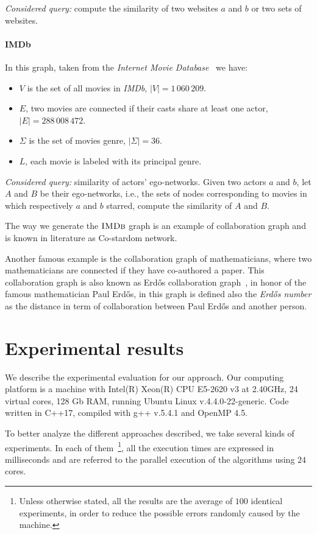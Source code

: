 \textsl{Considered query:} compute the similarity of two websites $a$ and $b$ or two sets of websites.

\paragraph*{IMDb} In this graph, taken from the \textit{Internet Movie Database}~\cite{imdb} we have:

\begin{itemize}
	\item $V$ is the set of all movies in \textit{IMDb},  $|V| = 1\,060\,209$.
	\item $E$, two movies are connected if their casts share at least one actor, $|E| = 288\,008\,472$.
	\item $\Sigma$ is the set of movies genre, $|\Sigma| = 36$.
	\item $L$, each movie is labeled with its principal genre.
\end{itemize}

\textsl{Considered query:} similarity of actors' ego-networks. Given two actors $a$ and $b$, let $A$ and $B$ be their ego-networks, i.e., the sets of nodes corresponding to movies in which respectively $a$ and $b$ starred, compute the similarity of $A$ and $B$.\medskip

The way we generate the $\textsc{IMDb}$ graph is an example of collaboration graph and is known in literature as Co-stardom network. 

Another famous example is the collaboration graph of mathematicians, where two mathematicians are connected if they have co-authored a paper. 
This collaboration graph is also known as Erdős collaboration graph~\cite{BATAGELJ2000173}, in honor of the famous mathematician Paul Erdős, in this graph is defined also the \textit{Erdős number} as the distance in term of collaboration between Paul Erdős and another person.

\section{Experimental results}

We describe the experimental evaluation for our approach. Our computing platform is a machine with Intel(R) Xeon(R) CPU E5-2620 v3 at 2.40GHz, 24 virtual cores, 128 Gb RAM, running Ubuntu Linux v.4.4.0-22-generic. Code written in C++17, compiled with g++ v.5.4.1 and OpenMP 4.5.\medskip

To better analyze the different approaches described, we take several kinds of experiments. In each of them~\footnote{Unless otherwise stated, all the results are the average of $100$ identical experiments, in order to reduce the possible errors randomly caused by the machine.}, all the execution times are expressed in milliseconds and are referred to the parallel execution of the algorithms using $24$ cores.\medskip

